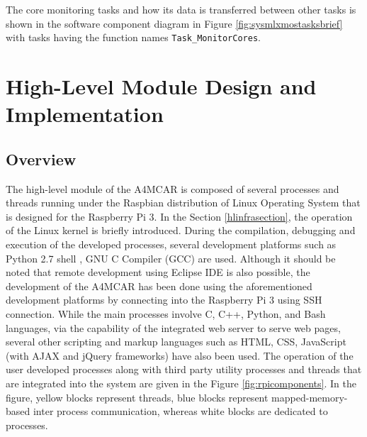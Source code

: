 The core monitoring tasks and how its data is transferred between other tasks is shown in the software component diagram in Figure \ref{fig:sysmlxmostasksbrief} with tasks having the function names \texttt{Task\texttt{\_}MonitorCores}.

\section{High-Level Module Design and Implementation}
\subsection{Overview}
The high-level module of the A4MCAR is composed of several processes and threads running under the Raspbian \cite{raspbiandownload} distribution of Linux Operating System that is designed for the Raspberry Pi 3. In the Section \ref{hlinfrasection}, the operation of the Linux kernel is briefly introduced. During the compilation, debugging and execution of the developed processes, several development platforms such as Python 2.7 shell \cite{python27}, GNU C Compiler (GCC) \cite{gcc} are used. Although it should be noted that remote development using Eclipse IDE \cite{remotedebuggingeclipse} is also possible, the development of the A4MCAR has been done using the aforementioned development platforms by connecting into the Raspberry Pi 3 using SSH connection. While the main processes involve C, C++, Python, and Bash \cite{bash} languages, via the capability of the integrated web server to serve web pages, several other scripting and markup languages such as HTML, CSS, JavaScript (with AJAX \cite{howajaxworks} and jQuery \cite{jquery} frameworks) have also been used. The operation of the user developed processes along with third party utility processes and threads that are integrated into the system are given in the Figure \ref{fig:rpicomponents}. In the figure, yellow blocks represent threads, blue blocks represent mapped-memory-based inter process communication, whereas white blocks are dedicated to processes.
